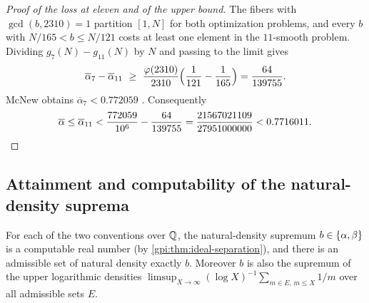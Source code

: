 \begin{proof}[Proof of the loss at eleven and of the upper bound]
The fibers with $\gcd(b,2310)=1$ partition $[1,N]$ for both optimization problems, and every
$b$ with $N/165<b\le N/121$ costs at least one element in the $11$-smooth problem. Dividing
$g_7(N)-g_{11}(N)$ by $N$ and passing to the limit gives
\[
 \overline\alpha_7-\overline\alpha_{11}\ \ge\ \frac{\varphi(2310)}{2310}
 \Bigl(\frac1{121}-\frac1{165}\Bigr)=\frac{64}{139755}.
\]
McNew obtains $\overline\alpha_7<0.772059$ \cite[Section~4]{McNew2015Sets}. Consequently
\[
 \overline\alpha\le\overline\alpha_{11}<\frac{772059}{10^6}-\frac{64}{139755}
 =\frac{21567021109}{27951000000}<0.7716011 . \qedhere
\]
\end{proof}

\subsection{Attainment and computability of the natural-density suprema}\label{gpi:sec:attain}
{\raggedright{}}

\begin{theorem}\label{gpi:thm:attain}
For each of the two conventions over $\mathbb{Q}$, the natural-density supremum $b\in\{\alpha,\beta\}$
is a computable real number (by \cref{gpi:thm:ideal-separation}), and there is an admissible
set of natural density exactly $b$.
Moreover $b$ is also the supremum of the upper logarithmic densities
$\limsup_{X\to\infty}(\log X)^{-1}\sum_{m\in E,\,m\le X}1/m$ over all admissible sets $E$.
\end{theorem}

